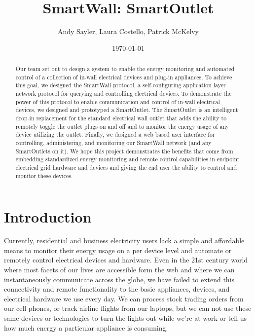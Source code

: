 \documentclass[12pt]{article}
\title{SmartWall: SmartOutlet}
\author{Andy Sayler, Laura Costello, Patrick McKelvy}
\date{\today}
\begin{document}
\maketitle
    
\begin{abstract}

Our team set out to design a system to enable the energy monitoring and
automated control of a collection of in-wall electrical devices and plug-in
appliances. To achieve this goal, we designed the SmartWall protocol,
a self-configuring application layer network protocol for querying and
controlling electrical devices. To demonstrate the power of this protocol
to enable communication and control of in-wall electrical devices, we
designed and prototyped a SmartOutlet. The SmartOutlet is an
intelligent drop-in
replacement for the standard electrical wall outlet that adds the
ability to remotely toggle the outlet plugs on and off and to monitor the
energy usage of any device utilizing the outlet. Finally, we designed a
web based user interface for controlling, administering, and
monitoring our SmartWall network (and any SmartOutlets on it). We hope
this project demonstrates the benefits that come from embedding
standardized energy monitoring and remote control capabilities in
endpoint electrical grid hardware and devices and giving the end user
the ability to control and monitor these devices.
  
\end{abstract}

\pagebreak

\tableofcontents

\pagebreak

\section{Introduction}

Currently, residential and business electricity users lack a simple
and affordable means to monitor their energy usage on a per device
level and automate or remotely control electrical devices and
hardware. Even in the 21st century world where most facets of our
lives are accessible form the web and where we can instantaneously
communicate across the globe, we have failed to extend this
connectivity and remote functionality to the basic appliances, devices,
and electrical hardware we use every day. We can process stock trading
orders from our cell phones, or track airline flights from our
laptops, but we can not use these same devices or technologies to turn
the lights out while we're at work or tell us how much energy a
particular appliance is consuming.
\end{document}
